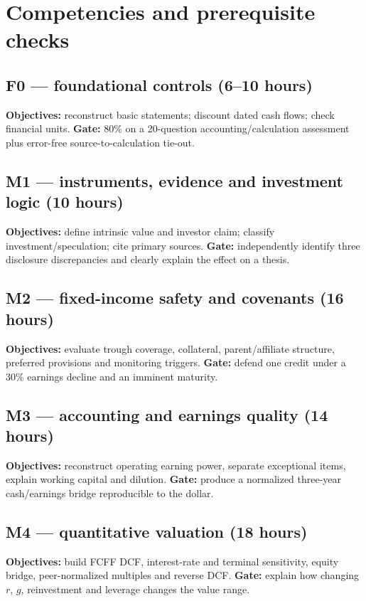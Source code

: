 \documentclass[11pt,letterpaper]{article}
\begin{document}
\section{Competencies and prerequisite checks}
\subsection{F0 --- foundational controls (6--10 hours)}
\textbf{Objectives:} reconstruct basic statements; discount dated cash flows; check financial units. \textbf{Gate:} 80\% on a 20-question accounting/calculation assessment plus error-free source-to-calculation tie-out.

\subsection{M1 --- instruments, evidence and investment logic (10 hours)}
\textbf{Objectives:} define intrinsic value and investor claim; classify investment/speculation; cite primary sources. \textbf{Gate:} independently identify three disclosure discrepancies and clearly explain the effect on a thesis.

\subsection{M2 --- fixed-income safety and covenants (16 hours)}
\textbf{Objectives:} evaluate trough coverage, collateral, parent/affiliate structure, preferred provisions and monitoring triggers. \textbf{Gate:} defend one credit under a 30\% earnings decline and an imminent maturity.

\subsection{M3 --- accounting and earnings quality (14 hours)}
\textbf{Objectives:} reconstruct operating earning power, separate exceptional items, explain working capital and dilution. \textbf{Gate:} produce a normalized three-year cash/earnings bridge reproducible to the dollar.

\subsection{M4 --- quantitative valuation (18 hours)}
\textbf{Objectives:} build FCFF DCF, interest-rate and terminal sensitivity, equity bridge, peer-normalized multiples and reverse DCF. \textbf{Gate:} explain how changing $r$, $g$, reinvestment and leverage changes the value range.
\end{document}
